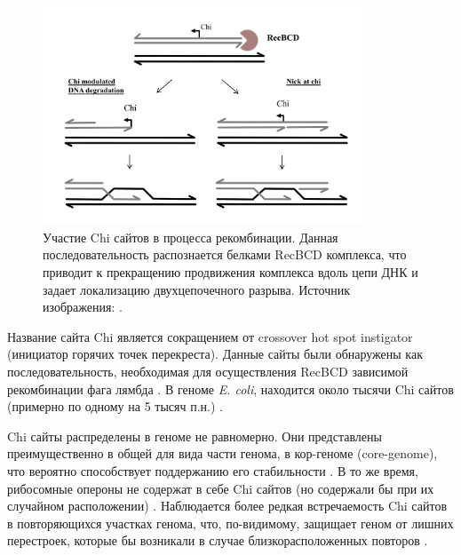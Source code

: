 \begin{figure}[!ht] 
  \center
    \includegraphics [width=0.85\textwidth] {Dissertation/images/lit/recombination/recombination_chi.png}
    \caption{Участие Chi сайтов в процесса рекомбинации. Данная последовательность распознается белками RecBCD комплекса, что приводит к прекращению продвижения комплекса вдоль цепи ДНК и задает локализацию двухцепочечного разрыва. Источник изображения: \cite{azeroglu2016recg}.}
    \label{img:rec_chi}
\end{figure}

Название сайта Chi является сокращением от crossover hot spot instigator (инициатор горячих точек перекреста). Данные сайты были обнаружены как последовательность, необходимая для осуществления RecBCD зависимой рекомбинации фага лямбда \cite{lam1974rec}. В геноме \textit{E. coli}, находится около тысячи Chi сайтов (примерно по одному на 5 тысяч п.н.) \cite{malone1978hotspots}.

Chi сайты распределены в геноме не равномерно. Они представлены преимущественно в общей для вида части генома, в кор-геноме (core-genome), что вероятно способствует поддержанию его стабильности \cite{halpern2007identification}. В то же время, рибосомные опероны не содержат в себе Chi сайтов (но содержали бы при их случайном расположении) \cite{reams2014recombination}. Наблюдается более редкая встречаемость Chi сайтов в повторяющихся участках генома, что, по-видимому, защищает геном от лишних перестроек, которые бы возникали в случае близкорасположенных повторов \cite{li2019positioning}.

